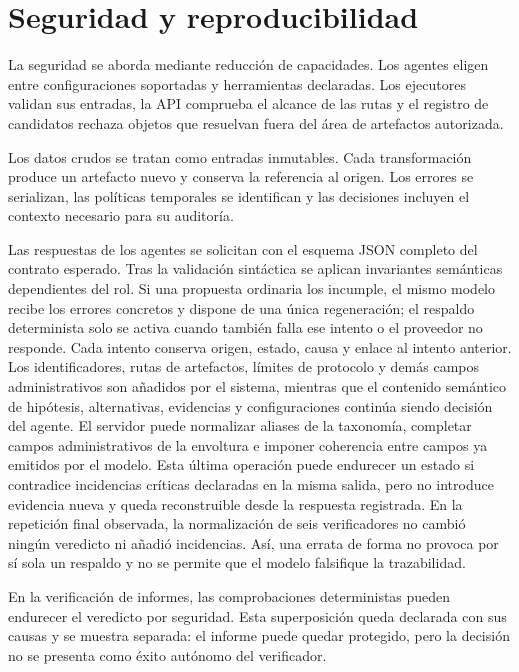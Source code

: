 \section{Seguridad y reproducibilidad}

La seguridad se aborda mediante reducción de capacidades. Los agentes eligen
entre configuraciones soportadas y herramientas declaradas. Los ejecutores
validan sus entradas, la API comprueba el alcance de las rutas y el registro de
candidatos rechaza objetos que resuelvan fuera del área de artefactos
autorizada.

Los datos crudos se tratan como entradas inmutables. Cada transformación produce
un artefacto nuevo y conserva la referencia al origen. Los errores se
serializan, las políticas temporales se identifican y las decisiones incluyen
el contexto necesario para su auditoría.

Las respuestas de los agentes se solicitan con el esquema JSON completo del
contrato esperado. Tras la validación sintáctica se aplican invariantes
semánticas dependientes del rol. Si una propuesta ordinaria los incumple, el
mismo modelo recibe los errores concretos y dispone de una única regeneración;
el respaldo determinista solo se activa cuando también falla ese intento o el
proveedor no responde. Cada intento conserva origen, estado, causa y enlace al
intento anterior. Los identificadores, rutas de artefactos, límites de
protocolo y demás campos administrativos son añadidos por el sistema, mientras
que el contenido semántico de hipótesis, alternativas, evidencias y
configuraciones continúa siendo decisión del agente. El servidor puede
normalizar aliases de la taxonomía, completar campos administrativos de la
envoltura e imponer coherencia entre campos ya emitidos por el modelo. Esta
última operación puede endurecer un estado si contradice incidencias críticas
declaradas en la misma salida, pero no introduce evidencia nueva y queda
reconstruible desde la respuesta registrada. En la repetición final observada,
la normalización de seis verificadores no cambió ningún veredicto ni añadió
incidencias. Así, una errata de forma no provoca por sí sola un respaldo y no se
permite que el modelo falsifique la trazabilidad.

En la verificación de informes, las comprobaciones deterministas pueden
endurecer el veredicto por seguridad. Esta superposición queda declarada con
sus causas y se muestra separada: el informe puede quedar protegido, pero la
decisión no se presenta como éxito autónomo del verificador.

